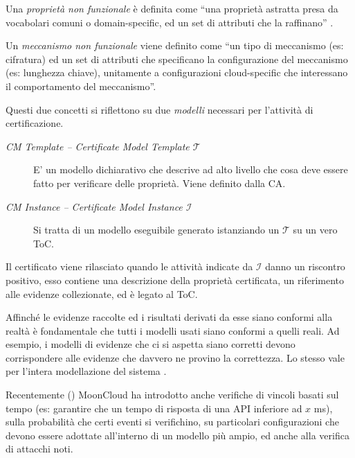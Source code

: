 Una \textit{proprietà non funzionale} è definita
come ``una proprietà astratta presa da vocabolari comuni o domain-specific, ed un set
di attributi che la raffinano'' \cite{mooncloud-semi-automatic-and-trustworthy}.

Un \textit{meccanismo non funzionale} viene definito come ``un tipo di meccanismo (es: cifratura)
ed un set di attributi che specificano la configurazione del meccanismo (es: lunghezza chiave),
unitamente a configurazioni cloud-specific che interessano il comportamento del
meccanismo''\cite{mooncloud-semi-automatic-and-trustworthy}.

Questi due concetti si riflettono su due \textit{modelli} necessari per l'attività di
certificazione.
\begin{description}
	\item[\textit{CM Template -- Certificate Model Template $\mathcal{T}$}]E' un modello dichiarativo che
	descrive ad alto livello che cosa deve essere fatto per verificare delle proprietà.
	Viene definito dalla CA.
	\item[\textit{CM Instance -- Certificate Model Instance $\mathcal{I}$}]Si tratta di un modello 
	eseguibile generato istanziando un $\mathcal{T}$ su un vero ToC.
\end{description}
Il certificato viene rilasciato quando le attività indicate da $\mathcal{I}$ danno un
riscontro positivo, esso contiene una descrizione della proprietà certificata,
un riferimento alle evidenze collezionate, ed è legato al ToC.


Affinché le evidenze raccolte ed i risultati derivati da esse siano conformi alla
realtà è fondamentale che tutti i modelli usati siano conformi a quelli reali. Ad esempio,
i modelli di evidenze che ci si aspetta siano corretti devono corrispondere alle
evidenze che davvero ne provino la correttezza. Lo stesso vale per l'intera modellazione
del sistema \cite{mooncloud-modelling-time}.

Recentemente (\cite{mooncloud-modelling-time})
MoonCloud ha introdotto anche verifiche di vincoli basati sul tempo (es: garantire che
un tempo di risposta di una API inferiore ad $x$ ms), sulla probabilità che
certi eventi si verifichino, su particolari configurazioni che devono essere adottate
all'interno di un modello più ampio, ed anche alla verifica di attacchi noti.